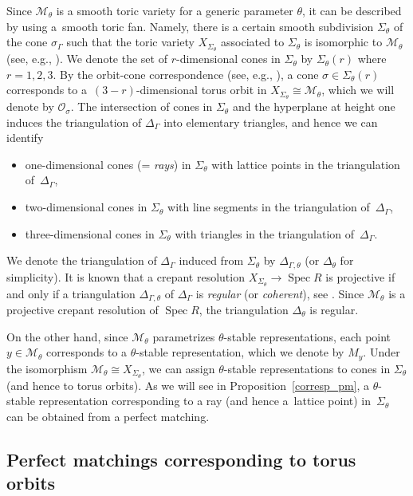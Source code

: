 \documentclass[10pt,a4paper]{amsart}
\numberwithin{equation}{section}
\theoremstyle{definition}
\newcommand{\calM}{\mathcal{M}}
\newcommand{\calO}{\mathcal{O}}
\newcommand{\Spec}{\operatorname{Spec}}
\begin{document}
Since $\calM_\theta$ is a smooth toric variety for a generic parameter $\theta$, it can be described by using a~smooth toric fan.
Namely, there is a certain smooth subdivision $\Sigma_\theta$ of the cone $\sigma_\Gamma$
such that the toric variety $X_{\Sigma_\theta}$ associated to $\Sigma_\theta$ is isomorphic to $\calM_\theta$ (see, e.g., \cite[Chapter~11]{CLS}).
We denote the set of $r$-dimensional cones in $\Sigma_\theta$ by $\Sigma_\theta(r)$ where $r=1, 2, 3$.
By the orbit-cone correspondence (see, e.g., \cite[Chapter~3]{CLS}), a cone $\sigma\in\Sigma_\theta(r)$ corresponds to a~$(3-r)$-dimensional
torus orbit in $X_{\Sigma_\theta}\cong\calM_\theta$, which we will denote by $\calO_\sigma$.
The intersection of cones in $\Sigma_\theta$ and the hyperplane at height one induces the triangulation of $\Delta_\Gamma$ into elementary triangles,
and hence we can identify
\begin{itemize}\itemsep=0pt
\item one-dimensional cones (= \emph{rays}) in $\Sigma_\theta$ with lattice points in the triangulation of~$\Delta_\Gamma$,
\item two-dimensional cones in $\Sigma_\theta$ with line segments in the triangulation of~$\Delta_\Gamma$,
\item three-dimensional cones in $\Sigma_\theta$ with triangles in the triangulation of~$\Delta_\Gamma$.
\end{itemize}
We denote the triangulation of $\Delta_\Gamma$ induced from $\Sigma_\theta$ by $\Delta_{\Gamma, \theta}$ (or $\Delta_\theta$ for simplicity).
It is known that a crepant resolution $X_{\Sigma_\theta}\to \Spec R$ is projective if and only if a triangulation $\Delta_{\Gamma, \theta}$ of $\Delta_\Gamma$ is \emph{regular} (or \emph{coherent}), see \cite[Proposition~2.4]{dais2001all}.
Since $\calM_\theta$ is a projective crepant resolution of $\Spec R$, the triangulation $\Delta_\theta$ is regular.


On the other hand, since $\calM_\theta$ parametrizes $\theta$-stable representations,
each point $y\in\calM_\theta$ corresponds to a $\theta$-stable representation, which we denote by $M_y$.
Under the isomorphism $\calM_\theta\cong X_{\Sigma_\theta}$,
we can assign $\theta$-stable representations to cones in $\Sigma_\theta$ (and hence to torus orbits).
As we will see in Proposition~\ref{corresp_pm}, a $\theta$-stable representation corresponding to a ray (and hence a~lattice point) in~$\Sigma_\theta$
can be obtained from a perfect matching.

\subsection{Perfect matchings corresponding to torus orbits}\label{subsec_cone_pm}
\end{document}
